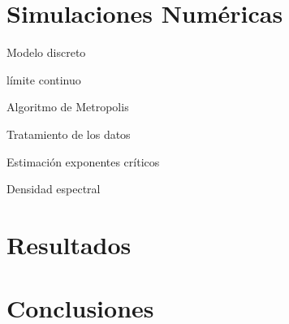 \documentclass[xcolor=dvipsnames]{beamer}
\begin{document}
\section{Simulaciones Numéricas}
\begin{frame}{Modelo discreto}
\end{frame}
\begin{frame}{límite continuo}
\end{frame}
\begin{frame}{Algoritmo de Metropolis}
\end{frame}
\begin{frame}{Tratamiento de los datos}
\end{frame}
\begin{frame}{Estimación exponentes críticos}
\end{frame}
\begin{frame}{Densidad espectral}
\end{frame}
\section{Resultados}
\begin{frame}{}
\end{frame}
\section{Conclusiones}
\begin{frame}
\end{frame}
\end{document}
